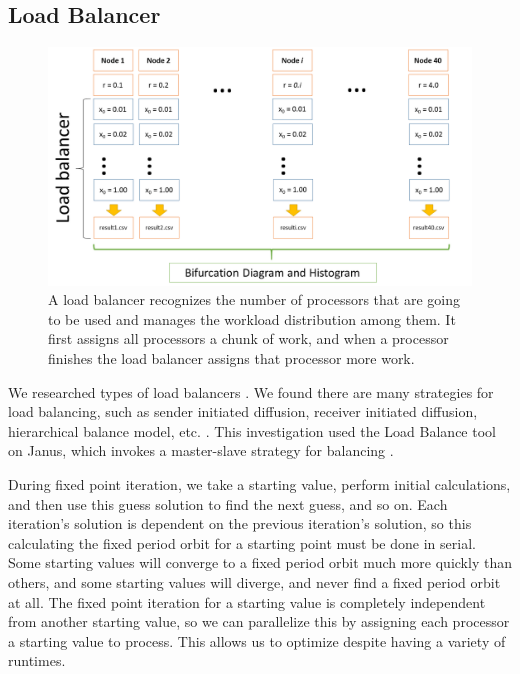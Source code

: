 \documentclass[12pt]{article}
\begin{document}
\subsection{Load Balancer}
\begin{figure}[H]
	\begin{center}
		\includegraphics[scale=0.4]{load_balancer}
\caption{A load balancer recognizes the number of processors that are going to be used and manages the workload distribution among them. It first assigns all processors a chunk of work, and when a processor finishes the load balancer assigns that processor more work.}
	\end{center}
\end{figure}
\hspace{5mm} We researched types of load balancers \cite{olivier}. We found there
are many strategies for load balancing, such as sender initiated
diffusion, receiver initiated diffusion, hierarchical balance model, etc. \cite{dlb}. This investigation
used the Load Balance tool on Janus, which invokes a master-slave
strategy for balancing \cite{janus}. 

During fixed point iteration, we take a starting value, perform initial calculations, and then use this guess solution to find the next guess, and so on. Each iteration's solution is dependent on the previous iteration's solution, so this calculating the fixed period orbit for a starting point must be done in serial. 
Some starting values will converge to a fixed period orbit much more
quickly than others, and some starting values will diverge, and never
find a fixed period orbit  at all. The fixed point iteration for a
starting value is completely independent from another starting value,
so we can parallelize this by assigning each processor a starting
value to process. This allows us to optimize despite having a variety
of runtimes. 
\end{document}

